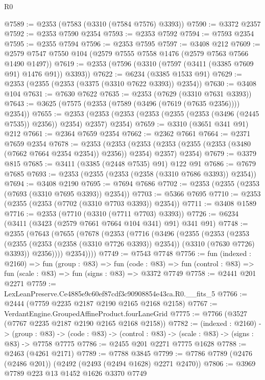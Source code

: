 \begin{lexlean}{R0}
\begin{coremodule}
@7589 := @2353 (@7583 (@3310 (@7584 @7576) @3393))
@7590 := @3372 @2357
@7592 := @2353 @7590 @2354
@7593 := @2353 @7592
@7594 := @7593 @2354
@7595 := @2355 @7594
@7596 := @2353 @7595
@7597 := @3408 @212
@7609 := @2579 @7547 @7550 @104 (@2579 @7555 @7558 @1476 (@2579 @7563 @7566 @1490 @1497))
@7619 := @2353 (@7596 (@3310 (@7597 (@3411 (@3385 @7609 @91) @1476 @91)) @3393))
@7622 := @6234 (@3385 @1533 @91)
@7629 := @2353 (@2355 (@2353 (@3375 (@3310 @7622 @3393)) @2354))
@7630 := @3408 @104
@7631 := @7630 @7622
@7635 := @2353 (@7629 (@3310 @7631 @3393))
@7643 := @3625 (@7575 (@2353 (@7589 (@3496 (@7619 (@7635 @2356)))) @2354))
@7655 := @2353 (@2353 (@2353 (@2353 (@2355 (@2353 (@3496 (@2445 @7535)) @2356)) @2354) @2357) @2354)
@7659 := @3310 (@3651 @341 @91) @212
@7661 := @2364 @7659 @2354
@7662 := @2362 @7661
@7664 := @2371 @7659 @2354
@7678 := @2353
    (@2353
      (@2353 (@2353 (@2355 (@2353 (@3480 (@7662 @7664 @2354 @2354)) @2356)) @2354) @2357)
      @2354)
@7679 := @3379 @815
@7685 := @3411 (@3385 (@2448 @7535) @91) @122 @91
@7686 := @7679 @7685
@7693 := @2353 (@2355 (@2353 (@2358 (@3310 @7686 @3393)) @2354))
@7694 := @3408 @2190
@7695 := @7694 @7686
@7702 := @2353 (@2355 (@2353 (@7693 (@3310 @7695 @3393)) @2354))
@7703 := @5366 @7695
@7710 := @2353 (@2355 (@2353 (@7702 (@3310 @7703 @3393)) @2354))
@7711 := @3408 @1589
@7716 := @2353 (@7710 (@3310 (@7711 @7703) @3393))
@7726 := @6234 (@3411 (@3423 (@2579 @7661 @7664 @104 @341) @91) @341 @91)
@7748 := @2355
    (@7643
      (@7655
        (@7678
          (@2353
            (@7716
              (@3496
                (@2355
                  (@2353
                    (@2353
                      (@2355 (@2353 (@2358 (@3310 @7726 @3393)) @2354))
                      (@3310 (@7630 @7726) @3393))
                    @2356))))
            @2354))))
@7749 := @7543 @7748
@7756 := fun (indexed : @2160) =>
  fun (group : @83) =>
  fun (code : @83) => fun (control : @83) => fun (scale : @83) => fun (signs : @83) => @3372 @7749
@7758 := @2441 @201 @2271
@7759 := LexLeanPreserve.Ce4885e9c60ef87cdf3c90908854e43ca.R0.__fits_5
@7766 := @2444 (@7759 @2235 @2187 @2190 @2165 @2168 @2158)
@7767 := VerdantEngine.GroupedAffineProduct.fourLaneGrid
@7775 := @7766 (@3527 (@7767 @2235 @2187 @2190 @2165 @2168 @2158))
@7782 := (indexed : @2160) ->
  (group : @83) -> (code : @83) -> (control : @83) -> (scale : @83) -> (signs : @83) -> @7758 @7775
@7786 := @2455 @201 @2271 @7775 @1628
@7788 := @2463 (@4261 @2171)
@7789 := @7788 @3845
@7799 := @7786 @7789 (@2476 (@2486 @201)) (@2492 (@2493 (@2494 @1628) @2271 @2470))
@7806 := @3969 @7789 @223 @13 @1452 @1626 @3370 @7749

\end{coremodule}
\end{lexlean}
